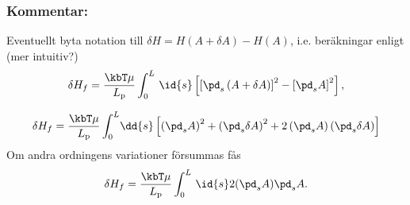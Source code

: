 \subsubsection{Kommentar:}
Eventuellt byta notation till  $\delta H = H(A+\delta A)-H(A)$, i.e. beräkningar enligt (mer intuitiv?)
\begin{equation}
    \delta H_f = \frac{\kbT\mu}{L_\text{p}}\int_0^L\,\id{s}\left[\left[\pd_s \left(A+\delta A\right)\right]^2-\left[\pd_sA\right]^2\right],
\end{equation}

\begin{equation}
    \delta H_f = \frac{\kbT\mu}{L_\text{p}}\int_0^L\!\dd{s} \left[\left(\pd_sA\right)^2+\left(\pd_s\delta A\right)^2+2\left(\pd_sA\right)\left(\pd_s\delta A\right)\right]
\end{equation}
Om andra ordningens variationer försummas fås
\begin{equation}
    \delta H_f = \frac{\kbT\mu}{L_\text{p}}\int_0^L\,\id{s}2(\pd_sA)\pd_sA.
\end{equation}